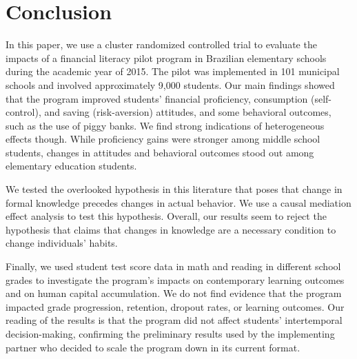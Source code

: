\section{Conclusion} \label{sec:conclusion}

In this paper, we use a cluster randomized controlled trial to evaluate the impacts of a financial literacy pilot program in Brazilian elementary schools during the academic year of 2015. The pilot was implemented in 101 municipal schools and involved approximately 9,000 students. Our main findings showed that the program improved students' financial proficiency, consumption (self-control), and saving (risk-aversion) attitudes, and some behavioral outcomes, such as the use of piggy banks. We find strong indications of heterogeneous effects though. While proficiency gains were stronger among middle school students, changes in attitudes and behavioral outcomes stood out among elementary education students. 

We tested the overlooked hypothesis in this literature that poses that change in formal knowledge precedes changes in actual behavior. We use a causal mediation effect analysis to test this hypothesis. Overall, our results seem to reject the hypothesis that claims that changes in knowledge are a necessary condition to change individuals' habits. 

Finally, we used student test score data in math and reading in different school grades to investigate the program's impacts on contemporary learning outcomes and on human capital accumulation. We do not find evidence that the program impacted grade progression, retention, dropout rates, or learning outcomes. Our reading of the results is that the program did not affect students' intertemporal decision-making, confirming the preliminary results used by the implementing partner who decided to scale the program down in its current format. 

